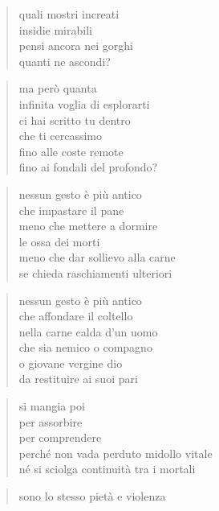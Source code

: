 	\begin{verse}
		quali mostri increati\\
		insidie mirabili\\
		pensi ancora nei gorghi\\
		quanti ne ascondi?
	\end{verse}

	\begin{verse}
		ma però quanta\\
		infinita voglia di esplorarti\\
		ci hai scritto tu dentro\\
		che ti cercassimo\\
		fino alle coste remote\\
		fino ai fondali del profondo?
	\end{verse}

\clearpage


\vspace*{2cm}

	\begin{verse}
		nessun gesto è più antico\\
		che impastare il pane\\
		meno che mettere a dormire\\
		le ossa dei morti\\
		meno che dar sollievo alla carne\\
		se chieda raschiamenti ulteriori
	\end{verse}

	\begin{verse}
		nessun gesto è più antico\\
		che affondare il coltello\\
		nella carne calda d’un uomo\\
		che sia nemico o compagno\\
		o giovane vergine dio\\
		da restituire ai suoi pari
	\end{verse}

	\begin{verse}
		si mangia poi\\
		per assorbire\\
		per comprendere\\
		perché non vada perduto midollo vitale\\
		né si sciolga continuità tra i mortali
	\end{verse}

	\begin{verse}
		sono lo stesso pietà e violenza
	\end{verse}

